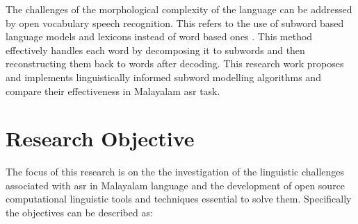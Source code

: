 
The challenges of the morphological complexity of the language
can be addressed by open vocabulary speech recognition. This refers to the use
of subword based language models and lexicons instead of word based ones \cite{creutz2007analysis}. This
method effectively handles each word by  decomposing it to
subwords and then reconstructing them back to words after decoding. This research work proposes and implements linguistically informed subword modelling algorithms and compare their effectiveness in Malayalam \gls{asr} task.




\section{Research Objective}

The focus of this research is on the the investigation of the linguistic
challenges associated with \gls{asr} in Malayalam language and the development
of open source computational linguistic tools and techniques essential to solve
them. Specifically the objectives can be described as:

